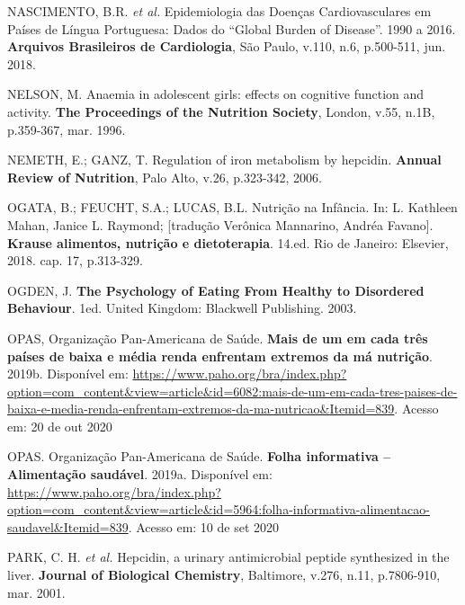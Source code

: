 \bigbreak

\noindent NASCIMENTO, B.R. \textit{et al.} Epidemiologia das Doenças Cardiovasculares em Países de Língua Portuguesa: Dados do “Global Burden of Disease”. 1990 a 2016. \textbf{Arquivos Brasileiros de Cardiologia}, São Paulo, v.110, n.6, p.500-511, jun. 2018.

\bigbreak

\noindent NELSON, M. Anaemia in adolescent girls: effects on cognitive function and activity. \textbf{The Proceedings of the Nutrition Society}, London, v.55, n.1B, p.359-367, mar. 1996.

\bigbreak

\noindent NEMETH, E.; GANZ, T. Regulation of iron metabolism by hepcidin. \textbf{Annual Review of Nutrition}, Palo Alto, v.26, p.323-342, 2006.

\bigbreak

\noindent OGATA, B.; FEUCHT, S.A.; LUCAS, B.L. Nutrição na Infância. In: L. Kathleen Mahan, Janice L. Raymond; [tradução Verônica Mannarino, Andréa Favano]. \textbf{Krause alimentos, nutrição e dietoterapia}. 14.ed. Rio de Janeiro: Elsevier, 2018. cap. 17, p.313-329.

\bigbreak

\noindent OGDEN, J. \textbf{The Psychology of Eating From Healthy to Disordered Behaviour}. 1ed. United Kingdom: Blackwell Publishing. 2003.

\bigbreak

\noindent OPAS, Organização Pan-Americana de Saúde. \textbf{Mais de um em cada três países de baixa e média renda enfrentam extremos da má nutrição}. 2019b. Disponível em: \url{https://www.paho.org/bra/index.php?option=com\_content\&view=article\&id=6082:mais-de-um-em-cada-tres-paises-de-baixa-e-media-renda-enfrentam-extremos-da-ma-nutricao\&Itemid=839}. Acesso em: 20 de out 2020

\bigbreak

\noindent OPAS. Organização Pan-Americana de Saúde. \textbf{Folha informativa – Alimentação saudável}. 2019a. Disponível em: \url{https://www.paho.org/bra/index.php?option=com\_content\&view=article\&id=5964:folha-informativa-alimentacao-saudavel\&Itemid=839}. Acesso em: 10 de set 2020

\bigbreak

\noindent PARK, C. H. \textit{et al.} Hepcidin, a urinary antimicrobial peptide synthesized in the liver. \textbf{Journal of Biological Chemistry}, Baltimore, v.276, n.11, p.7806-910, mar. 2001.

